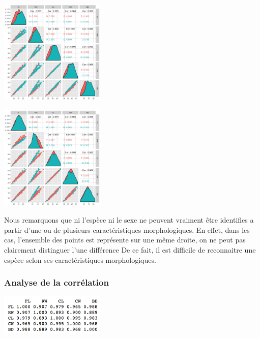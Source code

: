 \documentclass[10pt]{article}
\begin{document}
	\begin{minipage}[t]{0.6\textwidth}
		\includegraphics[width=50mm]{Figures/Crabs/matricial_plot_sp.png}
	\end{minipage}
	\begin{minipage}[t]{0.6\textwidth}
		\includegraphics[width=50mm]{Figures/Crabs/matricial_plot_sex.png}
	\end{minipage}
	\begin{center}
		\label{fig:multiplot_crabs__sp_sex}
	\end{center}
	
	Nous remarquons que ni l'espèce ni le sexe ne peuvent vraiment être identifies a partir d'une ou de plusieurs caractéristiques morphologiques.
	En effet, dans les cas, l'ensemble des points est représente sur une même droite, on ne peut pas clairement distinguer l'une différence De ce fait, il est difficile de reconnaitre une espèce selon ses caractéristiques morphologiques.
	
	\subsubsection{Analyse de la corrélation}
	
	\begin{center}
		\includegraphics[width=50mm]{Figures/Crabs/cor_crabsquant.png}
		\label{fig:cor_carbsquant}
	\end{center}
	
\end{document}
